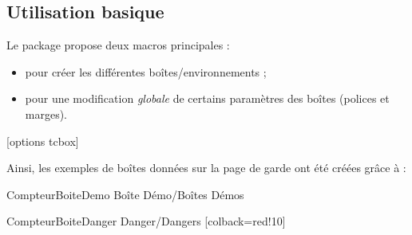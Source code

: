 \documentclass[french,11pt,a4paper]{article}
\begin{document}
\begin{codehigh}[language=latex/latex2,style/main=cyan!10,style/code=cyan!10]
\usepackage[breakable]{CreationBoites}         %
\end{codehigh}

\pagebreak

\subsection{Utilisation basique}

Le package propose deux macros principales :

\begin{itemize}
	\item {} pour créer les différentes boîtes/environnements ;
	\item {} pour une modification \textit{globale} de certains paramètres des boîtes (polices et marges).
\end{itemize}

\medskip

\begin{codehigh}[language=latex/latex2,style/main=cyan!10,style/code=cyan!10]
[options tcbox]
\ParamBoites[Clés]
\end{codehigh}

\medskip

Ainsi, les exemples de boîtes données sur la page de garde ont été créées grâce à :

\begin{codehigh}[language=latex/latex2,style/main=cyan!10,style/code=cyan!10]
    {CompteurBoiteDemo}            %
    {\faIcons}                     %
    {Boîte Démo/Boîtes Démos}      %

    {CompteurBoiteDanger}          %
    {}            %
    {Danger/Dangers}               %
    [colback=red!10]               %
\end{codehigh}

\begin{demohigh}[language=latex/latex2,style/main=cyan!10,style/code=cyan!10]
\setcounter{CompteurBoiteDemo}{0}
\setcounter{CompteurBoiteDanger}{0}
\begin{BoiteDeDemo}
    \lipsum[1][1]
\end{BoiteDeDemo}

\begin{BoiteDanger}
    \lipsum[2][1]
\end{BoiteDanger}
\end{demohigh}
\end{document}
